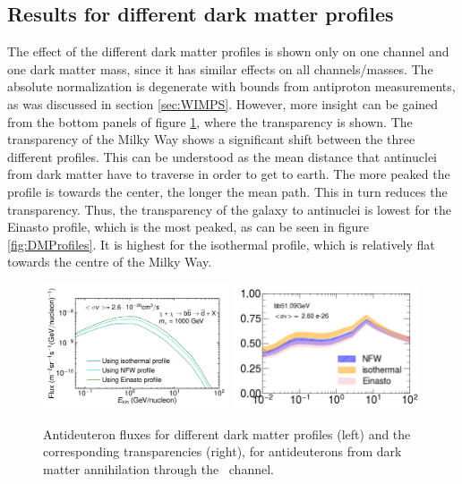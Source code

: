 \subsection{Results for different dark matter profiles}\label{sec:ResDMProfiles}
The effect of the different dark matter profiles is shown only on one channel and one dark matter mass, since it has similar effects on all channels/masses. The absolute normalization is degenerate with bounds from antiproton measurements, as was discussed in section \ref{sec:WIMPS}. However, more insight can be gained from the bottom panels of figure \ref{fig:different_DM_profiles_and_transparencies}, where the transparency is shown. The transparency of the Milky Way shows a significant shift between the three different profiles. This can be understood as the mean distance that antinuclei from dark matter have to traverse in order to get to earth. The more peaked the profile is towards the center, the longer the mean path. This in turn reduces the transparency. Thus, the transparency of the galaxy to antinuclei is lowest for the Einasto profile, which is the most peaked, as can be seen in figure \ref{fig:DMProfiles}. It is highest for the isothermal profile, which is relatively flat towards the centre of the Milky Way. 

\begin{figure}
    \centering
    \includegraphics[width=0.49\textwidth]{figures/bbdbarPaperLISDiffProfiles.pdf}
    \includegraphics[width=0.49\textwidth]{figures/Transparency_comparison_DM_profiles_bb51GeV_DMXs_option_nominal.png}
    \caption{Antideuteron fluxes for different dark matter profiles (left) and the corresponding transparencies (right), for antideuterons from dark matter annihilation through the \bb\ channel.}
    \label{fig:different_DM_profiles_and_transparencies}
\end{figure}

